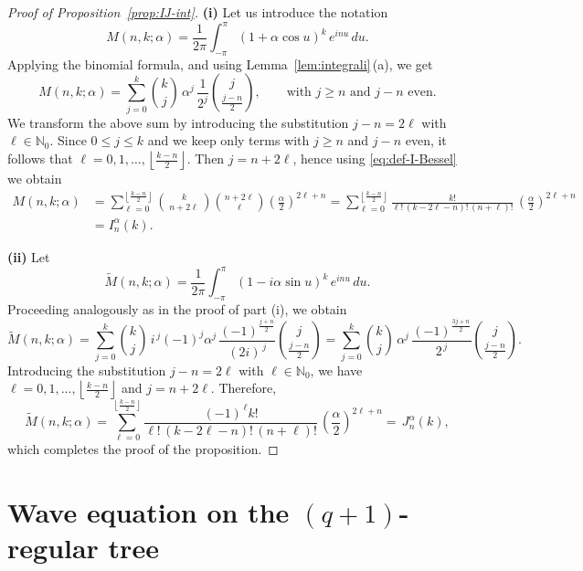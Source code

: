 \documentclass[12pt]{amsart}
\numberwithin{equation}{section}
\theoremstyle{boldremark}
\begin{document}
\begin{proof}[Proof of Proposition~\ref{prop:IJ-int}]

\textbf{(i)} Let us introduce the notation
$$
M(n,k;\alpha)=\frac{1}{2\pi}\int_{-\pi}^{\pi}(1+\alpha\cos u)^{k}\,e^{inu}\,du.
$$
Applying the binomial formula, 
and using Lemma~\ref{lem:integrali}\,(a), we get
$$
M(n,k;\alpha)=\sum_{j=0}^{k}\binom{k}{j}\,\alpha^{j}\,\frac{1}{2^{j}}
\binom{j}{\frac{j-n}{2}},
\qquad \text{with $j\ge n$ and $j-n$ even.}
$$
We transform the above sum by introducing the substitution $j-n=2\ell$ with $\ell\in\mathbb{N}_0$.
Since $0\le j\le k$ and we keep only terms with $j\ge n$ and $j-n$ even,
it follows that $\ell=0,1,\dots,\left\lfloor\frac{k-n}{2}\right\rfloor$.
Then $j=n+2\ell$, hence using \eqref{eq:def-I-Bessel} we obtain
\begin{align*}
M(n,k;\alpha)&=\sum_{\ell=0}^{\left\lfloor\frac{k-n}{2}\right\rfloor}
\binom{k}{\,n+2\ell\,}\binom{n+2\ell}{\,\ell\,}
\left(\frac{\alpha}{2}\right)^{2\ell+n}
=
\sum_{\ell=0}^{\left\lfloor\frac{k-n}{2}\right\rfloor}
\frac{k!}{\ell!\,(k-2\ell-n)!\,(n+\ell)!}\,
\left(\frac{\alpha}{2}\right)^{2\ell+n}\\
&=I_{n}^{\alpha}(k).
\end{align*}


\textbf{(ii)} Let
$$
\tilde M(n,k;\alpha)=\frac{1}{2\pi}\int_{-\pi}^{\pi}(1-i\alpha\sin u)^{k}\,e^{inu}\,du.
$$
Proceeding analogously as in the proof of part (i), we obtain
$$
\tilde M(n,k;\alpha)=\sum_{j=0}^{k}\binom{k}{j}\,i^{\,j}(-1)^{j}\alpha^{j}\,
\frac{(-1)^{\frac{j+n}{2}}}{(2i)^{\,j}}
\binom{j}{\frac{j-n}{2}}
=\sum_{j=0}^{k}\binom{k}{j}\,\alpha^{j}\,
\frac{(-1)^{\frac{3j+n}{2}}}{2^{\,j}}
\binom{j}{\frac{j-n}{2}}.
$$
Introducing the substitution $j-n=2\ell$ with $\ell\in\mathbb{N}_0$, we have
$\ell=0,1,\dots,\left\lfloor\frac{k-n}{2}\right\rfloor$ and $j=n+2\ell$. Therefore,
\[
\tilde M(n,k;\alpha) =\sum_{\ell=0}^{\left\lfloor\frac{k-n}{2}\right\rfloor}
\frac{(-1)^{\,\ell}k!}{\ell!\,(k-2\ell-n)!\,(n+\ell)!}\,
\left(\frac{\alpha}{2}\right)^{2\ell+n}=\,J_{n}^{\alpha}(k),
\]
which completes the proof of the proposition.
\end{proof}

\section{Wave equation on the $(q+1)$-regular tree}\label{sec. wave on tree sol}
\end{document}
